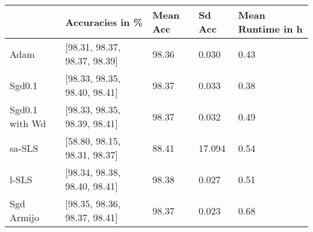 \begin{tabular}{lllll}
\toprule
{} &               Accuracies in \% & Mean Acc &  Sd Acc & Mean Runtime in h \\
\midrule
Adam           &  [98.31, 98.37, 98.37, 98.39] &    98.36 &   0.030 &              0.43 \\
Sgd0.1         &  [98.33, 98.35, 98.40, 98.41] &    98.37 &   0.033 &              0.38 \\
Sgd0.1 with Wd &  [98.33, 98.35, 98.39, 98.41] &    98.37 &   0.032 &              0.49 \\
sa-SLS         &  [58.80, 98.15, 98.31, 98.37] &    88.41 &  17.094 &              0.54 \\
l-SLS          &  [98.34, 98.38, 98.40, 98.41] &    98.38 &   0.027 &              0.51 \\
Sgd Armijo     &  [98.35, 98.36, 98.37, 98.41] &    98.37 &   0.023 &              0.68 \\
\bottomrule
\end{tabular}
